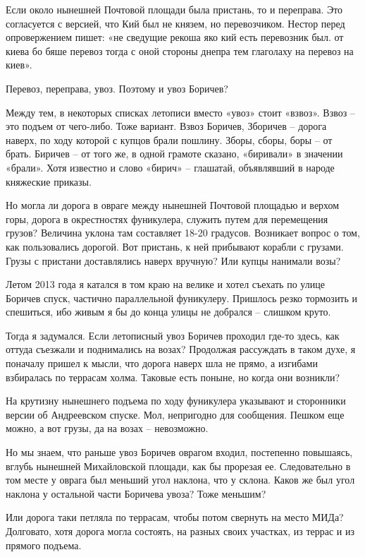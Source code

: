 Если около нынешней Почтовой площади была пристань, то и переправа. Это согласуется с версией, что Кий был не князем, но перевозчиком. Нестор перед опровержением пишет: «не сведущие рекоша яко кий есть перевозник был. от киева бо бяше перевоз тогда с оной стороны днепра тем глаголаху на перевоз на киев».

Перевоз, переправа, увоз. Поэтому и увоз Боричев?

Между тем, в некоторых списках летописи вместо «увоз» стоит «взвоз». Взвоз – это подъем от чего-либо. Тоже вариант. Взвоз Боричев, Зборичев – дорога наверх, по ходу которой с купцов брали пошлину. Зборы, сборы, боры – от брать. Биричев – от того же, в одной грамоте сказано, «биривали» в значении «брали». Хотя известно и слово «бирич» – глашатай, объявлявший в народе княжеские приказы.

Но могла ли дорога в овраге между нынешней Почтовой площадью и верхом горы, дорога в окрестностях фуникулера, служить путем для перемещения грузов? Величина уклона там составляет 18-20 градусов. Возникает вопрос о том, как пользовались дорогой. Вот пристань, к ней прибывают корабли с грузами. Грузы с пристани доставлялись наверх вручную? Или купцы нанимали возы?

Летом 2013 года я катался в том краю на велике и хотел съехать по улице Боричев спуск, частично параллельной фуникулеру. Пришлось резко тормозить и спешиться, ибо живым я бы до конца улицы не добрался – слишком круто.

Тогда я задумался. Если летописный увоз Боричев проходил где-то здесь, как оттуда съезжали и поднимались на возах? Продолжая рассуждать в таком духе, я поначалу пришел к мысли, что дорога наверх шла не прямо, а изгибами взбиралась по террасам холма.  Таковые есть поныне, но когда они возникли?

На крутизну нынешнего подъема по ходу фуникулера указывают и сторонники версии об Андреевском спуске. Мол, непригодно для сообщения. Пешком еще можно, а вот грузы, да на возах – невозможно. 

Но мы знаем, что раньше увоз Боричев оврагом входил, постепенно повышаясь, вглубь нынешней Михайловской площади, как бы прорезая ее. Следовательно в том месте у оврага был меньший угол наклона, что у склона. Каков же был угол наклона у остальной части Боричева увоза? Тоже меньшим? 

Или дорога таки петляла по террасам, чтобы потом свернуть на место МИДа? Долговато, хотя дорога могла состоять, на разных своих участках, из террас и из прямого подъема.

